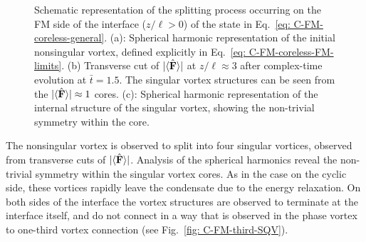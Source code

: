 \begin{figure}
    \caption[Dynamics of a nonsingular vortex connected across a cyclic to
        ferromagnetic interface]
    {\label{fig: C-FM-coreless-FM}Schematic representation of the
        splitting process occurring on the FM side of the interface
        (\(z/\ell > 0\)) of the state in Eq.~\eqref{eq: C-FM-coreless-general}.
        (a): Spherical harmonic representation of the initial nonsingular
        vortex, defined explicitly in Eq.~\eqref{eq: C-FM-coreless-FM-limits}.
        (b) Transverse cut of \(|\langle \hat{\vb{F}} \rangle | \) at \(z/\ell \approx 3\) after
        complex-time evolution at \(\bar{t} = 1.5\).
        The singular vortex structures can be seen from the
        \(|\langle \hat{\vb{F}} \rangle | \approx 1\) cores.
        (c): Spherical harmonic representation of the internal structure of
        the singular vortex, showing the non-trivial symmetry within the core.}
\end{figure}
The nonsingular vortex is observed to split into four singular vortices,
observed from transverse cuts of \(|\langle \hat{\vb{F}} \rangle | \).
Analysis of the spherical harmonics reveal the non-trivial symmetry within
the singular vortex cores.
As in the case on the cyclic side, these vortices rapidly leave the condensate
due to the energy relaxation.
On both sides of the interface the vortex structures are observed to terminate
at the interface itself, and do not connect in a way that is observed in the
phase vortex to one-third vortex connection (see
Fig.~\ref{fig: C-FM-third-SQV}).

